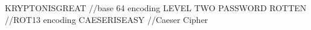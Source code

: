 KRYPTONISGREAT        
//base 64 encoding
LEVEL TWO PASSWORD ROTTEN
//ROT13 encoding
CAESERISEASY
//Caeser Cipher

